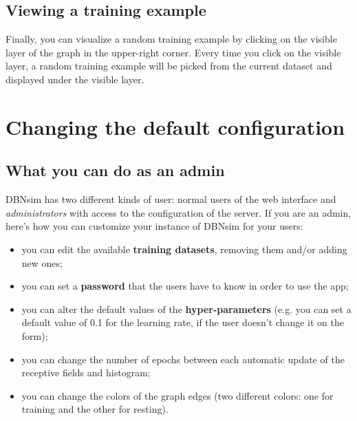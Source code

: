 \documentclass[a4paper]{article}
\begin{document}
		
	\subsection{Viewing a training example}

		
Finally, you can visualize a random training example by clicking on the visible layer of the graph in the upper-right corner. Every time you click on the visible layer, a random training example will be picked from the current dataset and displayed under the visible layer.
	


		
	\section{Changing the default configuration}


		
	\subsection{What you can do as an admin}

		
DBNsim has two different kinds of user: normal users of the web interface and \emph{administrators} with access to the configuration of the server. If you are an admin, here's how you can customize your instance of DBNsim for your users:
		
	\begin{itemize}
		
			
	\item you can edit the available \textbf{training datasets}, removing them and/or adding new ones;
			
	\item you can set a \textbf{password} that the users have to know in order to use the app;
			
	\item you can alter the default values of the \textbf{hyper-parameters} (e.g. you can set a default value of 0.1 for the learning rate, if the user doesn't change it on the form);
			
	\item you can change the number of epochs between each automatic update of the receptive fields and histogram;
			
	\item you can change the colors of the graph edges (two different colors: one for training and the other for resting).
		
	\end{itemize}
\end{document}
